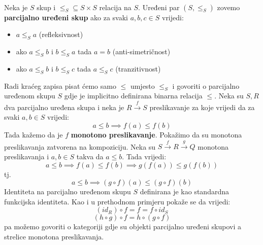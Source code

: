   \begin{example}\ \\
  
   \noindent Neka je $S$ skup i $\leq_S \subseteq S \times S$ relacija na $S$. Uređeni par $(S,
    \leq_S)$ zovemo \textbf{parcijalno uređeni skup} ako za svaki $a, b, c \in S$
    vrijedi:
    \begin{itemize}
      \item $a \leq_S a$ (refleksivnost)
      \item ako $a \leq_S b$ i $b \leq_S a$ tada $a = b$ (anti-simetričnost)
      \item ako $a \leq_S b$ i $b \leq_S c$ tada $a \leq_S c$ (tranzitivnost)
    \end{itemize}
    Radi kraćeg zapisa pisat ćemo samo $\leq$ umjesto $\leq_S$ i
  govoriti o parcijalno uređenom skupu $S$ gdje je implicitno definirana
  binarna relacija $\leq$.
  Neka su $S, R$ dva parcijalno uređena skupa i neka je $R \xrightarrow{f} S$
  preslikavanje za koje vrijedi da za svaki $a, b \in S$ vrijedi:
  \begin{equation*}
    a \leq b \implies f(a) \leq f(b)
  \end{equation*}
  Tada kažemo da je $f$ \textbf{monotono preslikavanje}.
  Pokažimo da su monotona preslikavanja zatvorena na kompoziciju.
  Neka su $S \xrightarrow{f} R \xrightarrow{g} Q$ monotona preslikavanja i $a,
  b \in S$ takva da $a \leq b$. Tada vrijedi:
  \begin{equation*}
    a \leq b \implies f(a) \leq f(b) \implies g(f(a)) \leq g(f(b))
  \end{equation*}
  tj.
  \begin{equation*}
    a \leq b \implies (g \circ f)(a) \leq (g \circ f)(b)
  \end{equation*}
  Identiteta na parcijalno uređenom skupu $S$ definirana je kao standardna
  funkcijska identiteta. Kao i u prethodnom primjeru pokaže se da vrijedi:
  \begin{equation*}
    (id_R) \circ f = f = f \circ id_S
  \end{equation*}
  \begin{equation*}
    (h \circ g) \circ f = h \circ (g \circ f)
  \end{equation*}
  pa možemo govoriti o kategoriji  gdje su objekti parcijalno
  uređeni skupovi a strelice monotona preslikavanja.\\
  \end{example}

